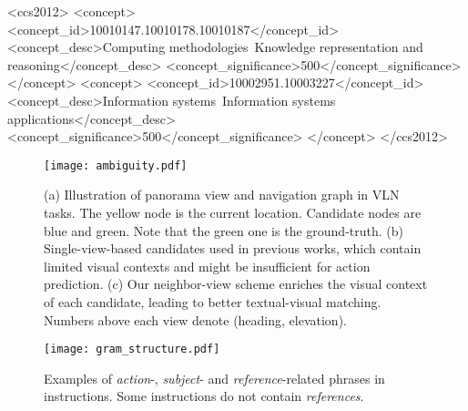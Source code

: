 \documentclass[sigconf]{acmart}
\begin{document}
\begin{CCSXML}
<ccs2012>
   <concept>
       <concept_id>10010147.10010178.10010187</concept_id>
       <concept_desc>Computing methodologies~Knowledge representation and reasoning</concept_desc>
       <concept_significance>500</concept_significance>
       </concept>
   <concept>
       <concept_id>10002951.10003227</concept_id>
       <concept_desc>Information systems~Information systems applications</concept_desc>
       <concept_significance>500</concept_significance>
       </concept>
 </ccs2012>
\end{CCSXML}







\maketitle
\begin{figure*}[!tbp]
	\centering
	\texttt{[image: ambiguity.pdf]}
	\vspace{-4mm}
	\caption{(a) Illustration of panorama view and navigation graph in VLN tasks. The yellow node is the current location. Candidate nodes are blue and green. Note that the green one is the ground-truth. (b) Single-view-based candidates used in previous works, which contain limited visual contexts and might be insufficient for action prediction. (c) Our neighbor-view scheme enriches the visual context of each candidate, leading to better textual-visual matching. Numbers above each view denote (heading, elevation).}
	\label{fig_ambiguity}
\end{figure*}
\begin{figure}[!tbp]
	\centering
	\texttt{[image: gram\_structure.pdf]}
	\vspace{-3mm}
	\caption{Examples of \textit{action}-, \textit{subject}- and \textit{reference}-related phrases in instructions. Some instructions do not contain \textit{references}.}
	\label{fig_gram_structure}
\end{figure}
\end{document}
